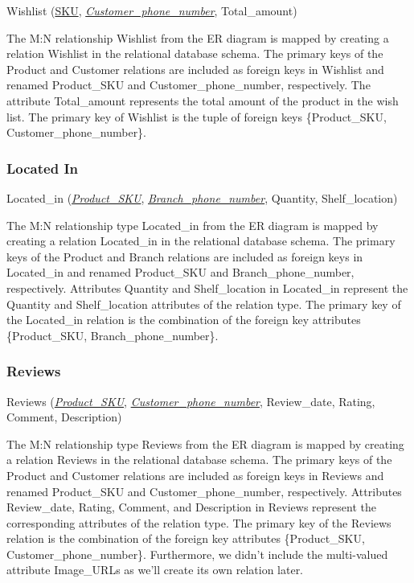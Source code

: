 \documentclass[11pt]{article}
\begin{document}
Wishlist (\underline{SKU}, \underline{\textit{Customer\_phone\_number}}, Total\_amount)

The M:N relationship Wishlist from the ER diagram is mapped by creating a relation Wishlist in the relational database schema. The primary keys of the Product and Customer relations are included as foreign keys in Wishlist and renamed Product\_SKU and Customer\_phone\_number, respectively. The attribute Total\_amount represents the total amount of the product in the wish list. The primary key of Wishlist is the tuple of foreign keys \{Product\_SKU, Customer\_phone\_number\}.

\subsubsection{Located In}

Located\_in (\underline{\textit{Product\_SKU}}, \underline{\textit{Branch\_phone\_number}}, Quantity, Shelf\_location)

The M:N relationship type Located\_in from the ER diagram is mapped by creating a relation Located\_in in the relational database schema. The primary keys of the Product and Branch relations are included as foreign keys in Located\_in and renamed Product\_SKU and Branch\_phone\_number, respectively. Attributes Quantity and Shelf\_location in Located\_in represent the Quantity and Shelf\_location attributes of the relation type. The primary key of the Located\_in relation is the combination of the foreign key attributes \{Product\_SKU, Branch\_phone\_number\}.

\subsubsection{Reviews}

Reviews (\underline{\textit{Product\_SKU}}, \underline{\textit{Customer\_phone\_number}}, Review\_date, Rating, Comment, Description)

The M:N relationship type Reviews from the ER diagram is mapped by creating a relation Reviews in the relational database schema. The primary keys of the Product and Customer relations are included as foreign keys in Reviews and renamed Product\_SKU and Customer\_phone\_number, respectively. Attributes Review\_date, Rating, Comment, and Description in Reviews represent the corresponding attributes of the relation type. The primary key of the Reviews relation is the combination of the foreign key attributes \{Product\_SKU, Customer\_phone\_number\}. Furthermore, we didn't include the multi-valued attribute Image\_URLs as we'll create its own relation later.
\end{document}
